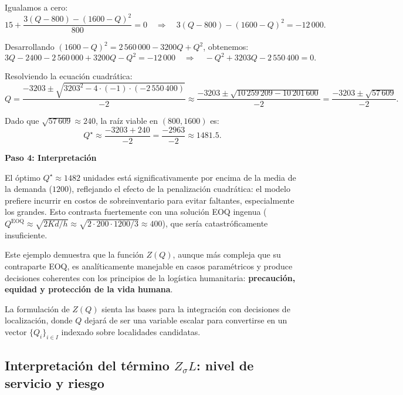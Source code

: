 \documentclass[
  spanish,
  us-letterpaper,
  DIV=11,
  numbers=noendperiod]{scrreprt}
\numberwithin{equation}{section}
\begin{document}
Igualamos a cero: \[
15 + \frac{3(Q - 800) - (1600 - Q)^2}{800} = 0
\quad \Longrightarrow \quad
3(Q - 800) - (1600 - Q)^2 = -12\,000.
\]

Desarrollando \((1600 - Q)^2 = 2\,560\,000 - 3200Q + Q^2\), obtenemos:
\[
3Q - 2400 - 2\,560\,000 + 3200Q - Q^2 = -12\,000
\quad \Longrightarrow \quad
-Q^2 + 3203Q - 2\,550\,400 = 0.
\]

Resolviendo la ecuación cuadrática: \[
Q = \frac{-3203 \pm \sqrt{3203^2 - 4 \cdot (-1) \cdot (-2\,550\,400)}}{-2}
\approx \frac{-3203 \pm \sqrt{10\,259\,209 - 10\,201\,600}}{-2}
= \frac{-3203 \pm \sqrt{57\,609}}{-2}.
\]

Dado que \(\sqrt{57\,609} \approx 240\), la raíz viable en
\((800,1600)\) es: \[
Q^\star \approx \frac{-3203 + 240}{-2} = \frac{-2963}{-2} \approx 1481.5.
\]

\textbf{Paso 4: Interpretación}

El óptimo \(Q^\star \approx 1482\) unidades está significativamente por
encima de la media de la demanda (\(1200\)), reflejando el efecto de la
penalización cuadrática: el modelo prefiere incurrir en costos de
sobreinventario para evitar faltantes, especialmente los grandes. Esto
contrasta fuertemente con una solución EOQ ingenua
(\(Q^{\text{EOQ}} \approx \sqrt{2Kd/h} \approx \sqrt{2\cdot200\cdot1200/3} \approx 400\)),
que sería catastróficamente insuficiente.

Este ejemplo demuestra que la función \(Z(Q)\), aunque más compleja que
su contraparte EOQ, es analíticamente manejable en casos paramétricos y
produce decisiones coherentes con los principios de la logística
humanitaria: \textbf{precaución, equidad y protección de la vida
humana}.

La formulación de \(Z(Q)\) sienta las bases para la integración con
decisiones de localización, donde \(Q\) dejará de ser una variable
escalar para convertirse en un vector \(\{Q_i\}_{i \in I}\) indexado
sobre localidades candidatas.

\subsection{\texorpdfstring{Interpretación del término \(Z_{\sigma} L\):
nivel de servicio y
riesgo}{Interpretación del término Z\_\{\textbackslash sigma\} L: nivel de servicio y riesgo}}\label{interpretaciuxf3n-del-tuxe9rmino-z_sigma-l-nivel-de-servicio-y-riesgo}
\end{document}
